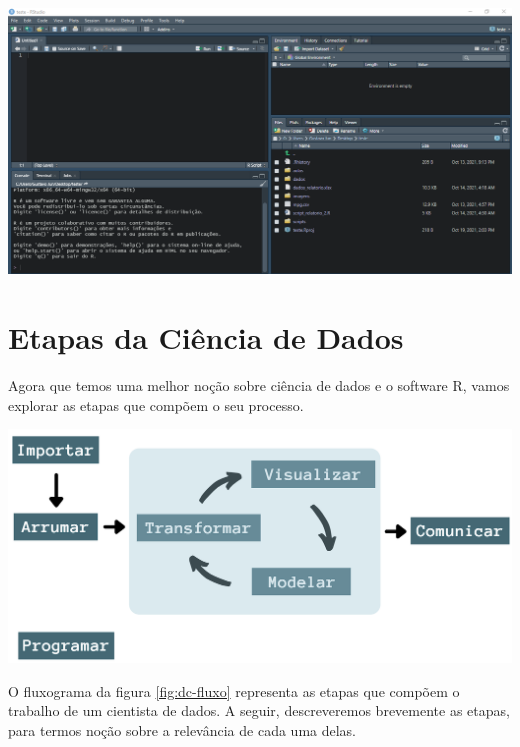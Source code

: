 \documentclass[
  brazilian,
]{book}
\let\origfigure\figure
\let\endorigfigure\endfigure
\renewenvironment{figure}[1][2] {
    \expandafter\origfigure\expandafter[H]
} {
    \endorigfigure
}
\begin{document}
\begin{figure}

{\centering \includegraphics[width=0.7\linewidth]{imagens/rstudio_tema2} 

}

\caption{Um exemplo de alteração na aparência do RStudio.}\label{fig:rstudio-tema2}
\end{figure}

\hypertarget{etapas-da-ciuxeancia-de-dados}{%
\section{Etapas da Ciência de Dados}\label{etapas-da-ciuxeancia-de-dados}}

Agora que temos uma melhor noção sobre ciência de dados e o software R, vamos explorar as etapas que compõem o seu processo.

\begin{figure}

{\centering \includegraphics[width=1\linewidth]{imagens/etapas_cd} 

}

\caption{Etapas do trabalho em ciência de dados. O ato de programar abrange todos os processos do fluxograma.}\label{fig:dc-fluxo}
\end{figure}

O fluxograma da figura \ref{fig:dc-fluxo} representa as etapas que compõem o trabalho de um cientista de dados. A seguir, descreveremos brevemente as etapas, para termos noção sobre a relevância de cada uma delas.
\end{document}
